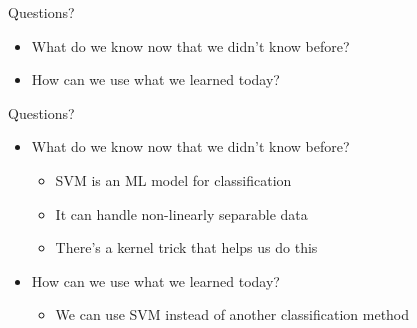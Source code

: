 \documentclass[aspectratio=169]{beamer}
\begin{document}
\begin{frame}{Questions?}
\begin{itemize}
	\item What do we know now that we didn't know before?
	\vspace{5em}
	\item How can we use what we learned today?
\end{itemize}
\end{frame}
\begin{frame}{Questions?}
\begin{itemize}
	\item What do we know now that we didn't know before?
	\begin{itemize}
		\item SVM is an ML model for classification
		\item It can handle non-linearly separable data
		\item There's a kernel trick that helps us do this
	\end{itemize}
	\item How can we use what we learned today?
	\begin{itemize}
		\item We can use SVM instead of another classification method
	\end{itemize}
\end{itemize}
\end{frame}
\end{document}
